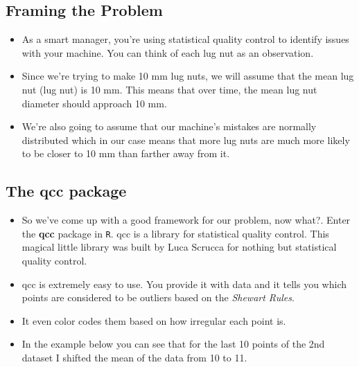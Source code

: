 \documentclass[a4paper,12pt]{article}
\begin{document}
\subsection{Framing the Problem}
\begin{itemize}
\item As a smart manager, you're using statistical quality control to identify issues with your machine. You can think of each lug nut as an observation. 
\item Since we're trying to make 10 mm lug nuts, we will assume that the mean lug nut (lug nut) is 10 mm. This means that over time, the mean lug nut diameter should approach 10 mm. 
\item We're also going to assume that our machine's mistakes are normally distributed which in our case means that more lug nuts are much more likely to be closer to 10 mm than farther away from it.
\end{itemize}
\newpage
\subsection{The qcc package}
\begin{itemize}
\item So we've come up with a good framework for our problem, now what?. Enter the \textbf{qcc} package in \texttt{R}. qcc is a library for statistical quality control. This magical little library was built by Luca Scrucca for nothing but statistical quality control. 
\item qcc is extremely easy to use. You provide it with data and it tells you which points are considered to be outliers based on the \textit{Shewart Rules}. 
\item It even color codes them based on how irregular each point is. 
\item In the example below you can see that for the last 10 points of the 2nd dataset I shifted the mean of the data from 10 to 11.
\end{itemize}
\end{document}
